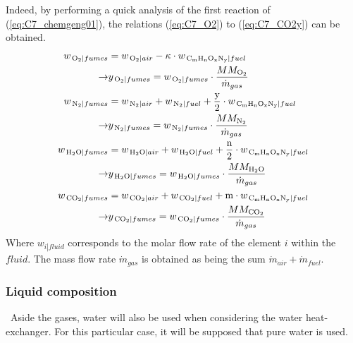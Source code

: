 Indeed, by performing a quick analysis of the first reaction of (\ref{eq:C7_chemgeng01}), the relations (\ref{eq:C7_O2}) to (\ref{eq:C7_CO2y}) can be obtained.
\begin{subequations}
\begin{align}
    w_{\left.\ce{O2}\right|{fumes}} &= w_{\left.\ce{O2}\right|{air}} - \kappa\cdot w_{\left.\ce{C_{\text{m}}H_{\text{n}}O_{\text{x}}N_{\text{y}}}\right|{fuel}}\label{eq:C7_O2}\\
    \rightarrow & y_{\left.\ce{O2}\right|{fumes}} =  w_{\left.\ce{O2}\right|{fumes}}\cdot \frac{MM_{\ce{O2}}}{\dot{m}_{gas}}\label{eq:C7_O2y}\\
    w_{\left.\ce{N2}\right|{fumes}} &= w_{\left.\ce{N2}\right|{air}} + w_{\left.\ce{N2}\right|{fuel}} + \frac{\text{y}}{2}\cdot w_{\left.\ce{C_{\text{m}}H_{\text{n}}O_{\text{x}}N_{\text{y}}}\right|{fuel}}\label{eq:C7_N2}\\
    \rightarrow & y_{\left.\ce{N2}\right|{fumes}} =  w_{\left.\ce{N2}\right|{fumes}}\cdot \frac{MM_{\ce{N2}}}{\dot{m}_{gas}}\label{eq:C7_N2y}\\
    w_{\left.\ce{H2O}\right|{fumes}} &= w_{\left.\ce{H2O}\right|{air}} + w_{\left.\ce{H2O}\right|{fuel}} + \frac{\text{n}}{2}\cdot w_{\left.\ce{C_{\text{m}}H_{\text{n}}O_{\text{x}}N_{\text{y}}}\right|{fuel}}\label{eq:C7_H2O}\\
    \rightarrow & y_{\left.\ce{H2O}\right|{fumes}} =  w_{\left.\ce{H2O}\right|{fumes}}\cdot \frac{MM_{\ce{H2O}}}{\dot{m}_{gas}}\label{eq:C7_H2Oy}\\
    w_{\left.\ce{CO2}\right|{fumes}} &= w_{\left.\ce{CO2}\right|{air}} + w_{\left.\ce{CO2}\right|{fuel}} + \text{m}\cdot w_{\left.\ce{C_{\text{m}}H_{\text{n}}O_{\text{x}}N_{\text{y}}}\right|{fuel}}\label{eq:C7_CO2}\\
    \rightarrow & y_{\left.\ce{CO2}\right|{fumes}} =  w_{\left.\ce{CO2}\right|{fumes}}\cdot \frac{MM_{\ce{CO2}}}{\dot{m}_{gas}}\label{eq:C7_CO2y}
\end{align}\label{eq:C7_compfumes}
\end{subequations}
Where $w_{\left.i\right|fluid}$ corresponds to the molar flow rate of the element $i$ within the $fluid$. The mass flow rate $\dot{m}_{gas}$ is obtained as being the sum $\dot{m}_{air}+\dot{m}_{fuel}$.

\subsubsection{Liquid composition}
\quad\ Aside the gases, water will also be used when considering the water heat-exchanger. For this particular case, it will be supposed that pure water is used.


